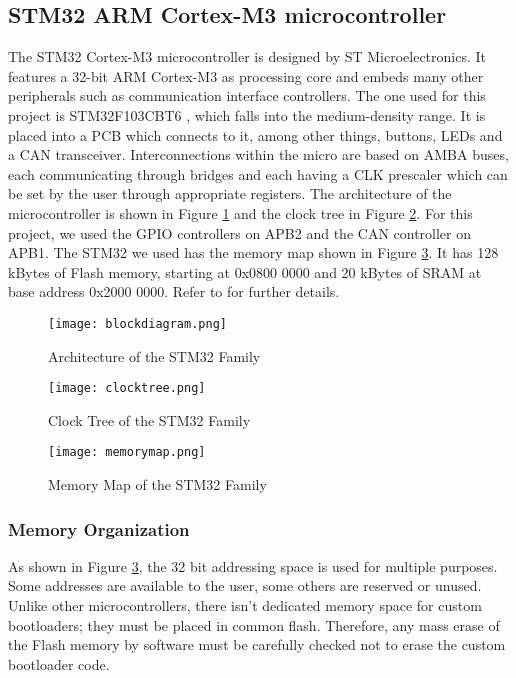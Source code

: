 \documentclass[11pt]{article} %
\begin{document}
\subsection{STM32 ARM Cortex-M3 microcontroller}
The STM32 Cortex-M3 microcontroller is designed by ST Microelectronics. It features a 32-bit ARM Cortex-M3 as processing core and embeds many other peripherals such as communication interface controllers. The one used for this project is STM32F103CBT6 \cite{ref:datasheet}, which falls into the medium-density range. It is placed into a PCB which connects to it, among other things, buttons, LEDs and a CAN transceiver.
Interconnections within the micro are based on AMBA buses, each communicating through bridges and each having a CLK prescaler which can be set by the user through appropriate registers. The architecture of the microcontroller is shown in Figure \ref{stm32arch} and the clock tree in Figure \ref{stm32clock}. For this project, we used the GPIO controllers on APB2 and the CAN controller on APB1.
The STM32 we used has the memory map shown in Figure \ref{stm32memory}. It has 128 kBytes of Flash memory, starting at 0x0800 0000 and 20 kBytes of SRAM at base address 0x2000 0000.
Refer to \cite{ref:refmanual} for further details.

\begin{figure}[htbp]
\begin{center}
\texttt{[image: blockdiagram.png]}
\end{center}
\caption{Architecture of the STM32 Family}
\label{stm32arch}
\end{figure}
\begin{figure}[htbp]
\begin{center}
\texttt{[image: clocktree.png]}
\end{center}
\caption{Clock Tree of the STM32 Family}
\label{stm32clock}
\end{figure}
\begin{figure}[htbp]
\begin{center}
\texttt{[image: memorymap.png]}
\end{center}
\caption{Memory Map of the STM32 Family}
\label{stm32memory}
\end{figure}

\subsubsection{Memory Organization}
As shown in Figure \ref{stm32memory}, the 32 bit addressing space is used for multiple purposes. Some addresses are available to the user, some others are reserved or unused. Unlike other microcontrollers, there isn't dedicated memory space for custom bootloaders; they must be placed in common flash. Therefore, any mass erase of the Flash memory by software must be carefully checked not to erase the custom bootloader code.
\end{document}

